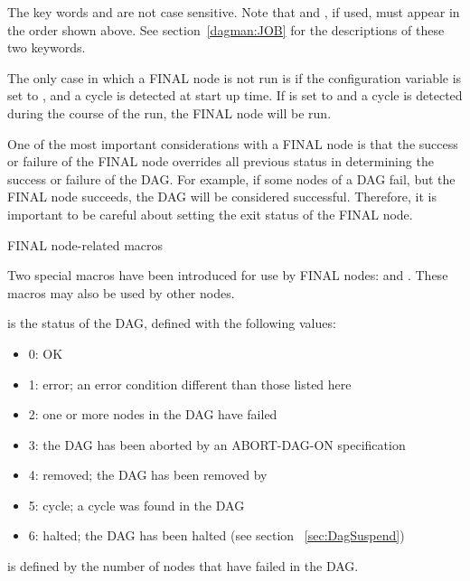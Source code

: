 The key words  and  are not case sensitive.
Note that  and , if used, must appear
in the order shown above.
See section~\ref{dagman:JOB} for the descriptions of these two keywords.

The only case in which a FINAL node is not run
is if the configuration variable  
is set to ,
and a cycle is detected at start up time.
If  is set to  and
a cycle is detected during the course of the run, 
the FINAL node will be run.

One of the most important considerations with a FINAL node is that the
success or failure of the FINAL node overrides all previous status
in determining the success or failure of the DAG.
For example, if some nodes of a DAG fail,
but the FINAL node succeeds, the DAG will be considered successful.
Therefore, it is important
to be careful about setting the exit status of the FINAL node.

\begin{description}
\item[FINAL node-related macros]
\end{description}

Two special macros have been introduced for use by FINAL nodes:
 and .
These macros may also be used by other nodes.

 is the status of the DAG,
defined with the following values:
\begin{itemize}
\item 0: OK
\item 1: error; an error condition different than those listed here
\item 2: one or more nodes in the DAG have failed
\item 3: the DAG has been aborted by an ABORT-DAG-ON specification
\item 4: removed; the DAG has been removed by 
\item 5: cycle; a cycle was found in the DAG
\item 6: halted; the DAG has been halted (see section ~\ref{sec:DagSuspend})
\end{itemize}

 is defined by the number of nodes that have failed in the
DAG.

